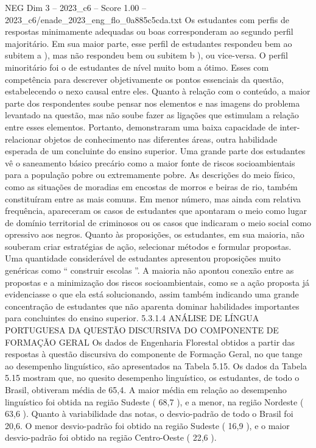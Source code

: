 \begin{textsample}{NEG Dim 3 – 2023\_c6 – Score 1.00 – 2023\_c6/enade\_2023\_eng\_flo\_0a885c5cda.txt}
Os estudantes com perfis de respostas minimamente adequadas ou boas corresponderam ao segundo perfil majoritário.
Em sua maior parte, esse perfil de estudantes respondeu bem ao subitem a ), mas não respondeu bem ou subitem b ), ou vice-versa.
O perfil minoritário foi o de estudantes de nível muito bom a ótimo.
Esses com competência para descrever objetivamente os pontos essenciais da questão, estabelecendo o nexo causal entre eles.
Quanto à relação com o conteúdo, a maior parte dos respondentes soube pensar nos elementos e nas imagens do problema levantado na questão, mas não soube fazer as ligações que estimulam a relação entre esses elementos.
Portanto, demonstraram uma baixa capacidade de inter-relacionar objetos de conhecimento nas diferentes áreas, outra habilidade esperada de um concluinte do ensino superior.
Uma grande parte dos estudantes vê o saneamento básico precário como a maior fonte de riscos socioambientais para a população pobre ou extremamente pobre.
As descrições do meio físico, como as situações de moradias em encostas de morros e beiras de rio, também constituíram entre as mais comuns.
Em menor número, mas ainda com relativa frequência, apareceram os casos de estudantes que apontaram o meio como lugar de domínio territorial de criminosos ou os casos que indicaram o meio social como opressivo aos negros.
Quanto às proposições, os estudantes, em sua maioria, não souberam criar estratégias de ação, selecionar métodos e formular propostas.
Uma quantidade considerável de estudantes apresentou proposições muito genéricas como “ construir escolas ”.
A maioria não apontou conexão entre as propostas e a minimização dos riscos socioambientais, como se a ação proposta já evidenciasse o que ela está solucionando, assim também indicando uma grande concentração de estudantes que não aparenta dominar habilidades importantes para concluintes do ensino superior. 5.3.1.4 ANÁLISE DE LÍNGUA PORTUGUESA DA QUESTÃO DISCURSIVA DO COMPONENTE DE FORMAÇÃO GERAL Os dados de Engenharia Florestal obtidos a partir das respostas à questão discursiva do componente de Formação Geral, no que tange ao desempenho linguístico, são apresentados na Tabela 5.15.
Os dados da Tabela 5.15 mostram que, no quesito desempenho linguístico, os estudantes, de todo o Brasil, obtiveram média de 65,4.
A maior média em relação ao desempenho linguístico foi obtida na região Sudeste ( 68,7 ), e a menor, na região Nordeste ( 63,6 ).
Quanto à variabilidade das notas, o desvio-padrão de todo o Brasil foi 20,6.
O menor desvio-padrão foi obtido na região Sudeste ( 16,9 ), e o maior desvio-padrão foi obtido na região Centro-Oeste ( 22,6 ).

\end{textsample}
